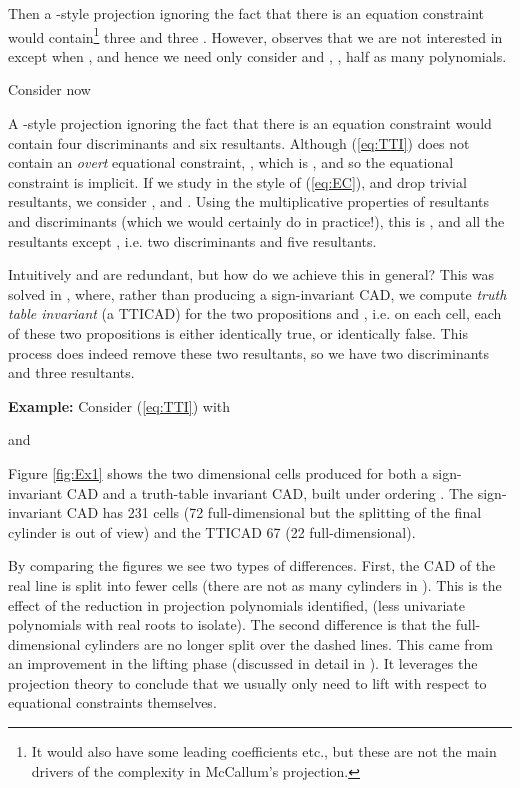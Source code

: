 \documentclass[runningheads,a4paper]{llncs}
\begin{document}
Then a \cite{McCallum1984}-style projection ignoring the fact that there is an equation constraint would contain\footnote{It would also have some leading coefficients etc., but these are not the main drivers of the complexity in McCallum's projection.} three  and three . However, \cite{McCallum1999a} observes that we are not interested in  except when , and hence we need only consider  and , , half as many polynomials.

\par Consider now

A \cite{McCallum1984}-style projection ignoring the fact that there is an equation constraint would contain four discriminants  and six resultants.
Although (\ref{eq:TTI}) does not contain an \emph{overt} equational constraint,  , which is , and so the equational constraint  is implicit. If we study  in the style of (\ref{eq:EC}), and drop trivial resultants, we consider ,  and  . Using the multiplicative properties of resultants and discriminants (which we would certainly do in practice!), this is ,  and all the resultants except , i.e. two discriminants and five resultants.
\par
Intuitively  and  are redundant, but how do we achieve this in general? This was solved in \cite{Bradfordetal2013b}, where, rather than producing a sign-invariant CAD, we compute  \emph{truth table invariant} (a TTICAD) for the two propositions  and , i.e. on each cell, each of these two propositions is either identically true, or identically false. This process does indeed remove these two resultants, so we have two discriminants and three resultants.

\vspace*{0.1in}

\noindent \textbf{Example:}  Consider (\ref{eq:TTI}) with 

and

Figure \ref{fig:Ex1} shows the two dimensional cells produced for both a sign-invariant CAD and a truth-table invariant CAD, built under ordering .
The sign-invariant CAD has 231 cells (72 full-dimensional but the splitting of the final cylinder is out of view) and the TTICAD 67 (22 full-dimensional).

By comparing the figures we see two types of differences.  First, the CAD of the real line is split into fewer cells (there are not as many cylinders in ).  This is the effect of the reduction in projection polynomials identified, (less univariate polynomials with real roots to isolate).  The second difference is that the full-dimensional cylinders are no longer split over the dashed lines. This came from an improvement in the lifting phase (discussed in detail in \cite{Bradfordetal2014a}).  It leverages the projection theory to conclude that we usually only need to lift with respect to equational constraints themselves.
\end{document}
